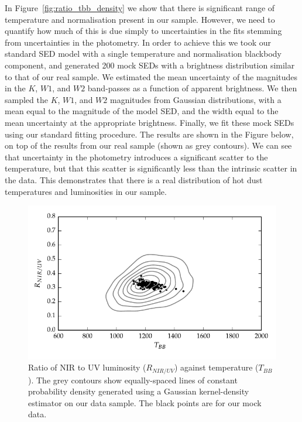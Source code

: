 In Figure~\ref{fig:ratio_tbb_density} we show that there is significant range of temperature and normalisation present in our sample. 
However, we need to quantify  how much of this is due simply to uncertainties in the fits stemming from uncertainties in the photometry. 
In order to achieve this we took our standard SED model with a single temperature and normalisation blackbody component, and generated 200 mock SEDs with a brightness distribution similar to that of our real sample. 
We estimated the mean uncertainty of the magnitudes in the $K$, $W1$, and $W2$ band-passes as a function of apparent brightness. 
We then sampled the $K$, $W1$, and $W2$ magnitudes from Gaussian distributions, with a mean equal to the magnitude of the model SED, and the width equal to the mean uncertainty at the appropriate brightness. 
Finally, we fit these mock SEDs using our standard fitting procedure. 
The results are shown in the Figure below, on top of the results from our real sample (shown as grey contours). 
We can see that uncertainty in the photometry introduces a significant scatter to the temperature, but that this scatter is significantly less than the intrinsic scatter in the data. 
This demonstrates that there is a real distribution of hot dust temperatures and luminosities in our sample. 

\begin{figure}
  \centering
  \includegraphics[width=\textwidth]{figures/chapter05/ratio_tbb_contours.pdf}
  \caption[{Ratio of NIR to UV luminosity ($R_{NIR/UV}$) against temperature ($T_{BB}$).}]{Ratio of NIR to UV luminosity ($R_{NIR/UV}$) against temperature ($T_{BB}$). The grey contours show equally-spaced lines of constant probability density generated using a Gaussian kernel-density estimator on our data sample. The black points are for our mock data.}
  \label{fig:ratio_tbb_contours}
\end{figure}

